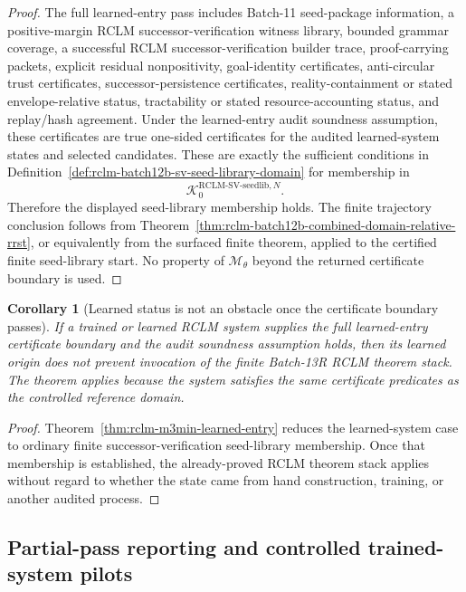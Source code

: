 \documentclass[11pt,a4paper]{article}
\newtheorem{corollary}[theorem]{Corollary}
\newcommand{\Kcal}{\mathcal K}
\newcommand{\RCLM}{\mathrm{RCLM}}
\begin{document}
\begin{proof}
The full learned-entry pass includes Batch-11 seed-package information, a positive-margin RCLM successor-verification witness library, bounded grammar coverage, a successful RCLM successor-verification builder trace, proof-carrying packets, explicit residual nonpositivity, goal-identity certificates, anti-circular trust certificates, successor-persistence certificates, reality-containment or stated envelope-relative status, tractability or stated resource-accounting status, and replay/hash agreement.  Under the learned-entry audit soundness assumption, these certificates are true one-sided certificates for the audited learned-system states and selected candidates.  These are exactly the sufficient conditions in Definition~\ref{def:rclm-batch12b-sv-seed-library-domain} for membership in
\[
\Kcal_0^{\RCLM\text{-}\mathrm{SV\mbox{-}seedlib},N}.
\]
Therefore the displayed seed-library membership holds.  The finite trajectory conclusion follows from Theorem~\ref{thm:rclm-batch12b-combined-domain-relative-rrst}, or equivalently from the surfaced finite theorem, applied to the certified finite seed-library start.  No property of $\mathcal M_\theta$ beyond the returned certificate boundary is used.
\end{proof}

\begin{corollary}[Learned status is not an obstacle once the certificate boundary passes]
\label{cor:rclm-m3min-learned-status-not-obstacle}
If a trained or learned RCLM system supplies the full learned-entry certificate boundary and the audit soundness assumption holds, then its learned origin does not prevent invocation of the finite Batch-13R RCLM theorem stack.  The theorem applies because the system satisfies the same certificate predicates as the controlled reference domain.
\end{corollary}

\begin{proof}
Theorem~\ref{thm:rclm-m3min-learned-entry} reduces the learned-system case to ordinary finite successor-verification seed-library membership.  Once that membership is established, the already-proved RCLM theorem stack applies without regard to whether the state came from hand construction, training, or another audited process.
\end{proof}

\subsection{Partial-pass reporting and controlled trained-system pilots}
\end{document}
